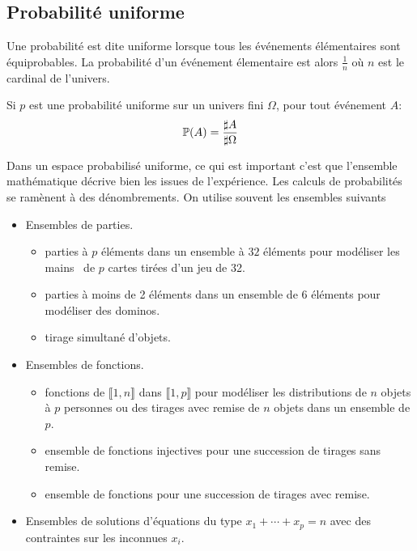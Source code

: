 \subsection{Probabilité uniforme}
\begin{defi}
 Une probabilité est dite uniforme lorsque tous les événements élémentaires sont équiprobables. La probabilité d'un événement élementaire est alors $\frac{1}{n}$ où $n$ est le cardinal de l'univers.
\end{defi}
\begin{prop}
  Si $p$ est une probabilité uniforme sur un univers fini $\Omega$, pour tout événement $A$:
\begin{displaymath}
  \mathbb{P}(A) = \frac{\sharp A}{\sharp \Omega}
\end{displaymath}
\end{prop}
Dans un espace probabilisé uniforme, ce qui est important c'est que l'ensemble mathématique décrive bien les issues de l'expérience. Les calculs de probabilités se ramènent à des dénombrements. On utilise souvent les ensembles suivants
\begin{itemize}
 \item Ensembles de parties.
\begin{itemize}
  \item parties à $p$ éléments dans un ensemble à $32$ éléments pour modéliser les \og mains\fg~ de $p$ cartes tirées d'un jeu de 32.
  \item parties à moins de 2 éléments dans un ensemble de 6 éléments pour modéliser des dominos.
  \item tirage simultané d'objets.
\end{itemize}
 
 \item Ensembles de fonctions.
 \begin{itemize}
   \item fonctions de $\llbracket 1,n\rrbracket$ dans $\llbracket 1,p\rrbracket$  pour modéliser les distributions  de $n$ objets à $p$ personnes ou des tirages avec remise de $n$ objets dans un ensemble de $p$.
   \item ensemble de fonctions injectives pour une succession de tirages sans remise.
   \item ensemble de fonctions pour une succession de tirages avec remise.
 \end{itemize}
 \item Ensembles de solutions d'équations du type $x_1+\cdots+x_p=n$ avec des contraintes sur les inconnues $x_i$.
\end{itemize}

